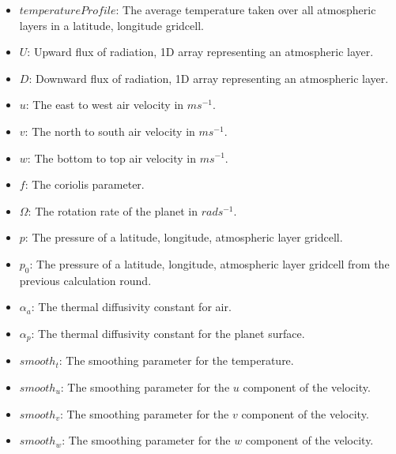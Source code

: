 \begin{itemize}
    \item $temperatureProfile$: The average temperature taken over all atmospheric layers in a latitude, longitude gridcell.
    \item $U$: Upward flux of radiation, 1D array representing an atmospheric layer.
    \item $D$: Downward flux of radiation, 1D array representing an atmospheric layer.
    \item $u$: The east to west air velocity in $ms^{-1}$.
    \item $v$: The north to south air velocity in $ms^{-1}$.
    \item $w$: The bottom to top air velocity in $ms^{-1}$.
    \item $f$: The coriolis parameter.
    \item $\Omega$: The rotation rate of the planet in $rads^{-1}$.
    \item $p$: The pressure of a latitude, longitude, atmospheric layer gridcell.
    \item $p_0$: The pressure of a latitude, longitude, atmospheric layer gridcell from the previous calculation round.
    \item $\alpha_a$: The thermal diffusivity constant for air.
    \item $\alpha_p$: The thermal diffusivity constant for the planet surface.
    \item $smooth_t$: The smoothing parameter for the temperature.
    \item $smooth_u$: The smoothing parameter for the $u$ component of the velocity.
    \item $smooth_v$: The smoothing parameter for the $v$ component of the velocity.
    \item $smooth_w$: The smoothing parameter for the $w$ component of the velocity.
\end{itemize}